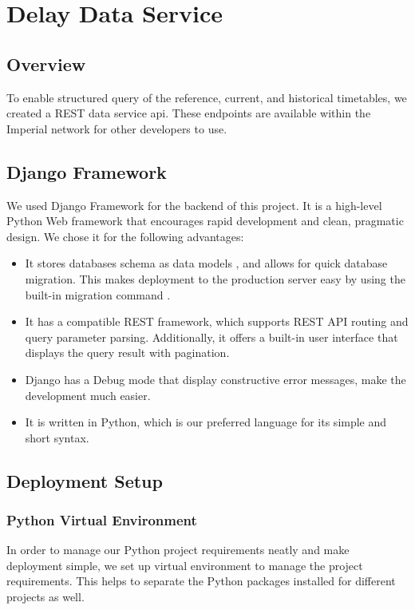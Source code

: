 \chapter{Delay Data Service}
\label{ch:data_service}
\section{Overview}
\par To enable structured query of the reference, current, and historical timetables, we created a REST data service \acrshort{api}. These endpoints are available within the Imperial network for other developers to use.

\section{Django Framework}
\par We used Django Framework \cite{django_framework} for the backend of this project. It is a high-level Python Web framework that encourages rapid development and clean, pragmatic design. We chose it for the following advantages:

\begin{itemize}
  \item It stores databases schema as data models \cite{django_model}, and allows for quick database migration. This makes deployment to the production server easy by using the built-in migration command \cite{django_migrations}.
  \item It has a compatible REST framework\cite{django_rest}, which supports REST API routing\cite{django_rest_routing} and query parameter parsing. Additionally, it offers a built-in user interface that displays the query result with pagination\cite{django_rest_pagination}.
  \item Django has a Debug mode that display constructive error messages, make the development much easier.
  \item It is written in Python, which is our preferred language for its simple and short syntax.
\end{itemize}

\section{Deployment Setup}
\subsection{Python Virtual Environment}
\par In order to manage our Python project requirements neatly and make deployment simple, we set up virtual environment\cite{virtualenv} \cite{virtualenvwrapper} to manage the project requirements. This helps to separate the Python packages installed for different projects as well.


